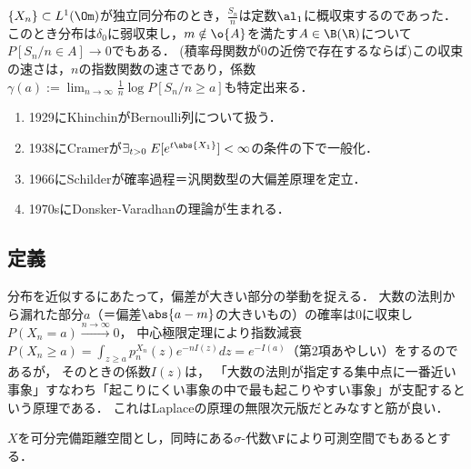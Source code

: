 \documentclass[uplatex,dvipdfmx]{jsreport}
\begin{document}
\begin{tcolorbox}[colframe=ForestGreen, colback=ForestGreen!10!white,breakable,colbacktitle=ForestGreen!40!white,coltitle=black,fonttitle=\bfseries\sffamily,
title=]
    $\{X_n\}\subset L^1(\Om)$が独立同分布のとき，$\frac{S_n}{n}$は定数$\al_1$に概収束するのであった．このとき分布は$\delta_0$に弱収束し，$m\notin\o{A}$を満たす$A\in\B(\R)$について$P[S_n/n\in A]\to0$でもある．
    (積率母関数が$0$の近傍で存在するならば)この収束の速さは，$n$の指数関数の速さであり，係数$\gamma(a):=\lim_{n\to\infty}\frac{1}{n}\log P[S_n/n\ge a]$も特定出来る．
\end{tcolorbox}

\begin{history}\mbox{}
    \begin{enumerate}
        \item 1929にKhinchinがBernoulli列について扱う．
        \item 1938にCramerが$\exists_{t>0}\;E[e^{t\abs{X_1}}]<\infty$の条件の下で一般化．
        \item 1966にSchilderが確率過程＝汎関数型の大偏差原理を定立．
        \item 1970sにDonsker-Varadhanの理論が生まれる．
    \end{enumerate}
\end{history}


\subsection{定義}

\begin{tcolorbox}[colframe=ForestGreen, colback=ForestGreen!10!white,breakable,colbacktitle=ForestGreen!40!white,coltitle=black,fonttitle=\bfseries\sffamily,
    title=無限次元空間におけるLaplace原理]
    分布を近似するにあたって，偏差が大きい部分の挙動を捉える．
    大数の法則から漏れた部分$a$（＝偏差$\abs{a-m}$の大きいもの）の確率は$0$に収束し$P(X_n=a)\xrightarrow{n\to\infty}0$，
    中心極限定理により指数減衰$P(X_n\ge a)=\int_{z\ge a}p_n^{X_n}(z)e^{-nI(z)}dz=e^{-I(a)}$（第2項あやしい）をするのであるが，
    そのときの係数$I(z)$は，
    「大数の法則が指定する集中点に一番近い事象」すなわち「起こりにくい事象の中で最も起こりやすい事象」が支配するという原理である．
    これはLaplaceの原理の無限次元版だとみなすと筋が良い．
\end{tcolorbox}

\begin{notation}
    $X$を可分完備距離空間とし，同時にある$\sigma$-代数$\F$により可測空間でもあるとする．
\end{notation}
\end{document}
